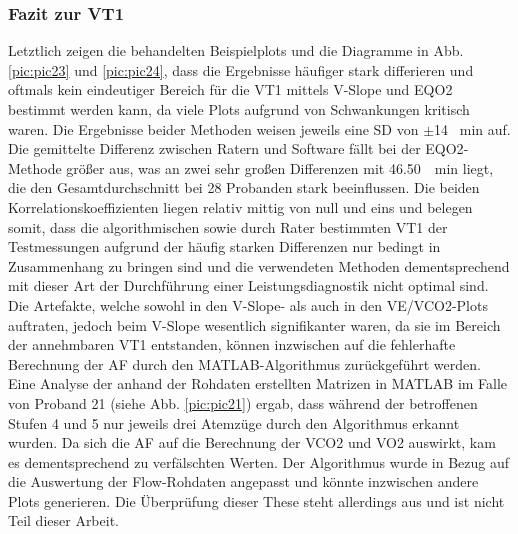 \subsubsection{Fazit zur VT1}
%
Letztlich zeigen die behandelten Beispielplots und die Diagramme in Abb. \ref{pic:pic23} und \ref{pic:pic24}, dass die Ergebnisse häufiger stark differieren und oftmals kein eindeutiger Bereich für die VT1 mittels V-Slope und \gls{EQO2} bestimmt werden kann, da viele Plots aufgrund von Schwankungen kritisch waren. Die Ergebnisse beider Methoden weisen jeweils eine \gls{SD} von $\pm$14 \si{\per\minute} auf. Die gemittelte Differenz zwischen Ratern und Software fällt bei der \gls{EQO2}-Methode größer aus, was an zwei sehr großen Differenzen mit \SIlist{46,50}{\per\minute} liegt, die den Gesamtdurchschnitt bei 28 Probanden stark beeinflussen. Die beiden Korrelationskoeffizienten liegen relativ mittig von null und eins und belegen somit, dass die algorithmischen sowie durch Rater bestimmten VT1 der Testmessungen aufgrund der häufig starken Differenzen nur bedingt in Zusammenhang zu bringen sind und die verwendeten Methoden dementsprechend mit dieser Art der Durchführung einer Leistungsdiagnostik nicht optimal sind.\\
Die Artefakte, welche sowohl in den V-Slope- als auch in den \gls{VE}/\gls{VCO2}-Plots auftraten, jedoch beim V-Slope wesentlich signifikanter waren, da sie im Bereich der annehmbaren VT1 entstanden, können inzwischen auf die fehlerhafte Berechnung der \gls{AF} durch den MATLAB-Algorithmus zurückgeführt werden. Eine Analyse der anhand der Rohdaten erstellten Matrizen in MATLAB im Falle von Proband 21 (siehe Abb. \ref{pic:pic21}) ergab, dass während der betroffenen Stufen 4 und 5 nur jeweils drei Atemzüge durch den Algorithmus erkannt wurden. Da sich die \gls{AF} auf die Berechnung der \gls{VCO2} und \gls{VO2} auswirkt, kam es dementsprechend zu verfälschten Werten. Der Algorithmus wurde in Bezug auf die Auswertung der Flow-Rohdaten angepasst und könnte inzwischen andere Plots generieren. Die Überprüfung dieser These steht allerdings aus und ist nicht Teil dieser Arbeit.
%
